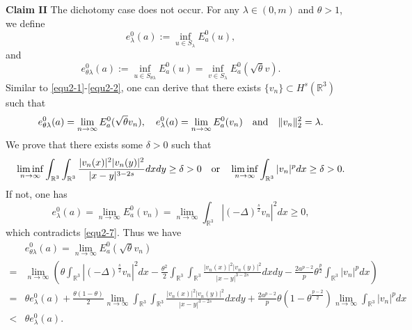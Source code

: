 \documentclass[reqno, 11pt]{amsart} %
\numberwithin{equation}{section}
\begin{document}
	\noindent
	{\bf  Claim II} The dichotomy case does not occur. For any $\lambda\in (0, m)$ and $\theta>1$, we define
	\begin{equation*}
		e^{0}_{\lambda}(a):=\inf_{u\in S_{\lambda}}E^{0}_{a}(u),
	\end{equation*}
	and
	\begin{equation*}
		e^{0}_{\theta\lambda}(a):=\inf_{u\in S_{\theta\lambda}}E^{0}_{a}(u)=\inf_{v\in S_{\lambda}}E^{0}_{a}(\sqrt{\theta}v).
	\end{equation*}
	Similar to \eqref{equ2-1}-\eqref{equ2-2}, one can derive that there exists $\{v_{n}\}\subset H^{s}(\mathbb{R}^{3})$ such that
	\begin{equation*}
		e^{0}_{\theta\lambda}(a)=\lim _{n\rightarrow\infty}E^{0}_{a}(\sqrt{\theta}v_{n}),\quad  e^{0}_{\lambda}(a)=\lim _{n\rightarrow\infty}E^{0}_{a}(v_{n})\quad \hbox{and}\quad \|v_{n}\|_{2}^{2}=\lambda.
	\end{equation*}
	We prove that there exists some $\delta>0$ such that
	\begin{equation*}
		\liminf_{n\rightarrow\infty}\int_{\mathbb{R}^{3}}\int_{\mathbb{R}^{3}}\frac{|v_{n}(x)|^{2}|v_{n}(y)|^{2}}{|x-y|^{3-2s}}dxdy\geq \delta>0\quad \hbox{or}\quad	\liminf_{n\rightarrow\infty}\int_{\mathbb{R}^{3}}|v_{n}|^{p}dx\geq \delta>0.
	\end{equation*}
	If not, one has
	\begin{equation*}
		e^{0}_{\lambda}(a)=\lim _{n\rightarrow\infty}E^{0}_{a}(v_{n})=\lim _{n\rightarrow\infty}\int_{\mathbb{R}^{3}}|(-\Delta)^{\frac{s}{2}} v_{n}|^{2}dx\geq0,
	\end{equation*}
	which contradicts \eqref{equ2-7}. Thus we have
	\begin{equation}\label{equ2-8}
		\begin{split}
			&e^{0}_{\theta\lambda}(a)=\lim_{n\rightarrow\infty}E^{0}_{a}(\sqrt{\theta}v_{n})\\
			=&\lim_{n\rightarrow\infty}\left( \theta\int_{\mathbb{R}^{3}}|(-\Delta)^{\frac{s}{2}} v_{n}|^{2}dx-\frac{\theta^{2}}{2}\int_{\mathbb{R}^{3}}\int_{\mathbb{R}^{3}}\frac{|v_{n}(x)|^{2}|v_{n}(y)|^{2}}{|x-y|^{3-2s}}dxdy-\frac{2a^{p-2}}{p}\theta^{\frac{p}{2}}\int_{\mathbb{R}^{3}}|v_{n}|^{p}dx\right) \\
			=&\theta e^{0}_{\lambda}(a)+\frac{\theta(1-\theta)}{2}\lim_{n\rightarrow\infty}\int_{\mathbb{R}^{3}}\int_{\mathbb{R}^{3}}\frac{|v_{n}(x)|^{2}|v_{n}(y)|^{2}}{|x-y|^{3-2s}}dxdy+\frac{2a^{p-2}}{p}\theta(1-\theta^{\frac{p-2}{2}})\lim_{n\rightarrow\infty}\int_{\mathbb{R}^{3}}|v_{n}|^{p}dx\\
			<&\theta e^{0}_{\lambda}(a).
		\end{split}
	\end{equation}
\end{document}
